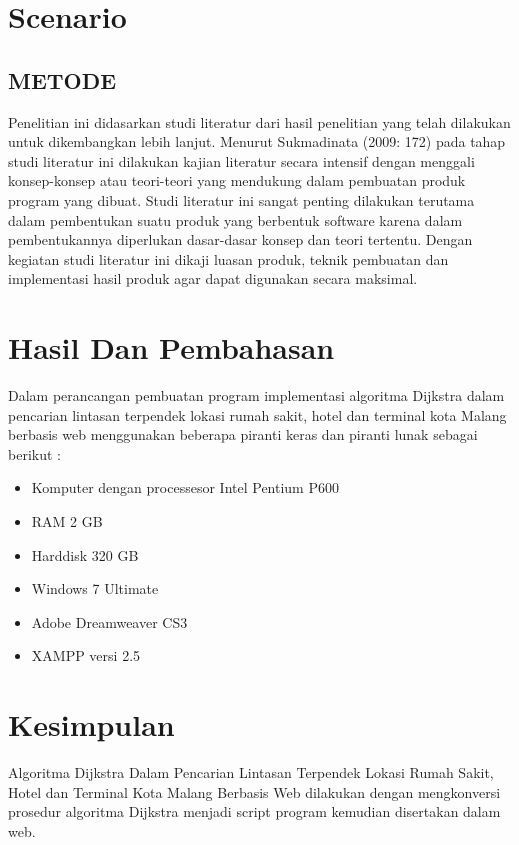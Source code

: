 \documentclass[conference]{IEEEtran}
\begin{document}
\section{Scenario}
\subsection{METODE}
Penelitian ini didasarkan studi literatur dari hasil penelitian yang telah dilakukan
untuk dikembangkan lebih lanjut. Menurut Sukmadinata (2009: 172) pada tahap studi literatur
ini dilakukan kajian literatur secara intensif dengan menggali konsep-konsep atau teori-teori
yang mendukung dalam pembuatan produk program yang dibuat. Studi literatur ini sangat
penting dilakukan terutama dalam pembentukan suatu produk yang berbentuk software karena
dalam pembentukannya diperlukan dasar-dasar konsep dan teori tertentu. Dengan kegiatan
studi literatur ini dikaji luasan produk, teknik pembuatan dan implementasi hasil produk agar
dapat digunakan secara maksimal. 

\section{Hasil Dan Pembahasan}
Dalam perancangan pembuatan program implementasi algoritma Dijkstra dalam
pencarian lintasan terpendek lokasi rumah sakit, hotel dan terminal kota Malang berbasis web
menggunakan beberapa piranti keras dan piranti lunak sebagai berikut :
\begin{itemize}
    \item Komputer dengan processesor Intel Pentium P600
    \item RAM 2 GB
    \item Harddisk 320 GB
    \item Windows 7 Ultimate
    \item Adobe Dreamweaver CS3
    \item XAMPP versi 2.5
  \end{itemize}
\section{Kesimpulan}
Algoritma Dijkstra Dalam Pencarian Lintasan
Terpendek Lokasi Rumah Sakit, Hotel dan Terminal Kota Malang Berbasis Web dilakukan
dengan mengkonversi prosedur algoritma Dijkstra menjadi script program kemudian
disertakan dalam web.




\end{document}
